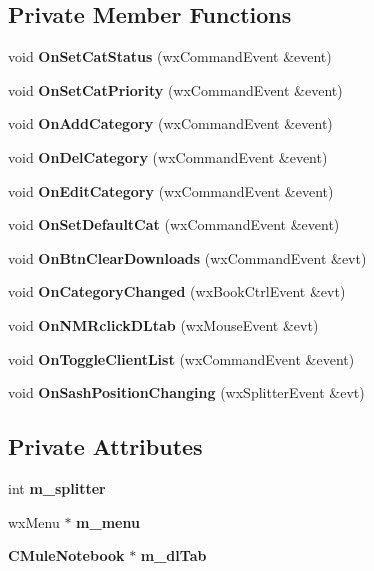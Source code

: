 \subsection*{Private Member Functions}
\begin{DoxyCompactItemize}
\item 
void {\bf OnSetCatStatus} (wxCommandEvent \&event)\label{classCTransferWnd_ae2653a00e01ce975dab0bd52f06fe97f}

\item 
void {\bf OnSetCatPriority} (wxCommandEvent \&event)\label{classCTransferWnd_a022212bb98df03e2d1a3ec2997cea64b}

\item 
void {\bf OnAddCategory} (wxCommandEvent \&event)\label{classCTransferWnd_a8192a48b955ffc92262802e4afe9dcba}

\item 
void {\bf OnDelCategory} (wxCommandEvent \&event)\label{classCTransferWnd_ac44b079b663c08ed196649deab614169}

\item 
void {\bf OnEditCategory} (wxCommandEvent \&event)\label{classCTransferWnd_a79786e40451f9ea88a5d01381c15b965}

\item 
void {\bf OnSetDefaultCat} (wxCommandEvent \&event)\label{classCTransferWnd_a8cbaef4ca29078090e656f06a3a11415}

\item 
void {\bf OnBtnClearDownloads} (wxCommandEvent \&evt)\label{classCTransferWnd_aae7f8b62b9bd891c545604f73c772a94}

\item 
void {\bf OnCategoryChanged} (wxBookCtrlEvent \&evt)\label{classCTransferWnd_a049b99e320f858f21a2d0fb5ed641aa8}

\item 
void {\bf OnNMRclickDLtab} (wxMouseEvent \&evt)\label{classCTransferWnd_a710ee16387757270fb537f2a45474e9e}

\item 
void {\bf OnToggleClientList} (wxCommandEvent \&event)\label{classCTransferWnd_a4a1e6f36c0c345a21e1910b309227ac5}

\item 
void {\bf OnSashPositionChanging} (wxSplitterEvent \&evt)\label{classCTransferWnd_a930683a83c03294c03b22d9e6f3a3201}

\end{DoxyCompactItemize}
\subsection*{Private Attributes}
\begin{DoxyCompactItemize}
\item 
int {\bf m\_\-splitter}\label{classCTransferWnd_abd7edab4d2df2c065af9364059127c14}

\item 
wxMenu $\ast$ {\bf m\_\-menu}\label{classCTransferWnd_a8c78c737011ec64f9260bb8e1663d20f}

\item 
{\bf CMuleNotebook} $\ast$ {\bf m\_\-dlTab}\label{classCTransferWnd_a1563fda8d0930aca6962cc321b692a0c}

\end{DoxyCompactItemize}
